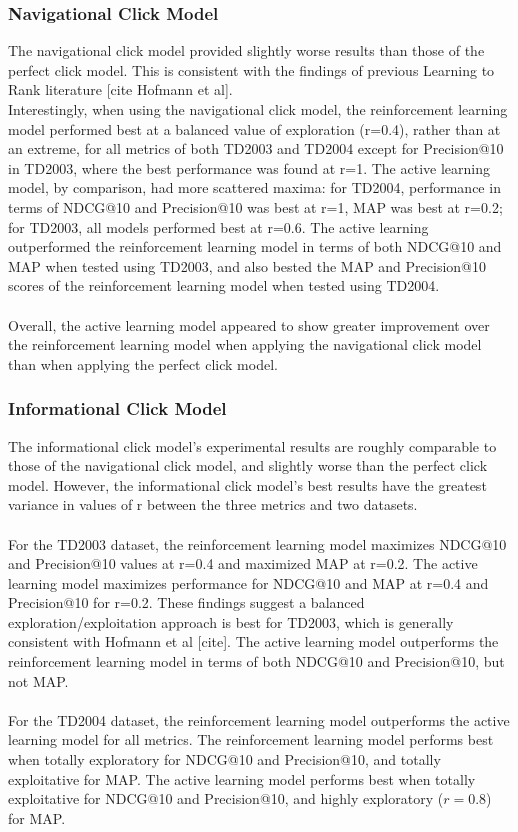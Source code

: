 \documentclass{acm_proc_article-sp}
\begin{document}
\subsubsection{Navigational Click Model}
The navigational click model provided slightly worse results than those of the perfect click model.  This is consistent with the findings of previous Learning to Rank literature [cite Hofmann et al].\\
Interestingly, when using the navigational click model, the reinforcement learning model performed best at a balanced value of exploration (r=0.4), rather than at an extreme, for all metrics of both TD2003 and TD2004 except for Precision@10 in TD2003, where the best performance was found at r=1.  The active learning model, by comparison, had more scattered maxima:  for TD2004, performance in terms of NDCG@10 and Precision@10 was best at r=1, MAP was best at r=0.2; for TD2003, all models performed best at r=0.6.   The active learning outperformed the reinforcement learning model in terms of both NDCG@10 and MAP when tested using TD2003, and also bested the MAP and Precision@10 scores of the reinforcement learning model when tested using TD2004.  \\ \\
Overall, the active learning model appeared to show greater improvement over the reinforcement learning model when applying the navigational click model than when applying the perfect click model. 

\subsubsection{Informational Click Model}
The informational click model’s experimental results are roughly comparable to those of the navigational click model, and slightly worse than the perfect click model.  However, the informational click model’s best results have the greatest variance in values of r between the three metrics and two datasets.   \\ \\
For the TD2003 dataset, the reinforcement learning model maximizes NDCG@10 and Precision@10 values at r=0.4 and maximized MAP at r=0.2.  The active learning model maximizes performance for NDCG@10 and MAP at r=0.4 and Precision@10 for r=0.2.  These findings suggest a balanced exploration/exploitation approach is best for TD2003, which is generally consistent with Hofmann et al [cite].  The active learning model outperforms the reinforcement learning model in terms of both NDCG@10 and Precision@10, but not MAP. \\ \\
For the TD2004 dataset, the reinforcement learning model outperforms the active learning model for all metrics.  The reinforcement learning model performs best when totally exploratory for NDCG@10 and Precision@10, and totally exploitative for MAP.  The active learning model performs best when totally exploitative for NDCG@10 and Precision@10, and highly exploratory ($r=0.8$) for MAP.  
\end{document}

